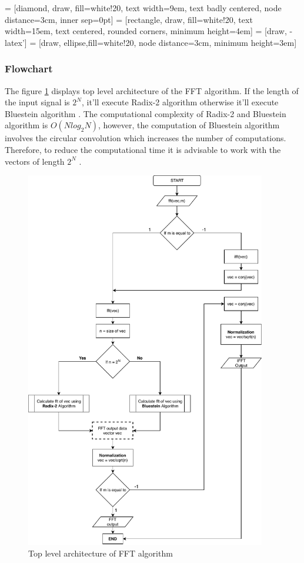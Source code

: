 \begin{refsection}
\newpage
 = [diamond, draw, fill=white!20,
text width=9em, text badly centered, node distance=3cm, inner sep=0pt]
 = [rectangle, draw, fill=white!20,
text width=15em, text centered, rounded corners, minimum height=4em]
 = [draw, -latex']
 = [draw, ellipse,fill=white!20, node distance=3cm,
minimum height=3em]

\subsubsection{Flowchart}
The figure \ref{FFT_flowchart} displays top level architecture of the FFT algorithm.  If the length of the input signal is $2^N$, it'll execute Radix-2 algorithm otherwise it'll execute Bluestein algorithm \cite{Rao2010a}. The computational complexity of Radix-2 and Bluestein algorithm is $O(Nlog_{2}N)$, however, the computation of Bluestein algorithm involves the circular convolution which increases the number of computations. Therefore, to reduce the computational time it is advisable to work with the vectors of length $2^N$ \cite{Chu2000}.


\begin{figure}[h]
	\centering
	\includegraphics[width=10.5cm]{./algorithms/fft/figures/FFT_flowchart.pdf}
	\caption{Top level architecture of FFT algorithm}\label{FFT_flowchart}
\end{figure}




\end{refsection}
